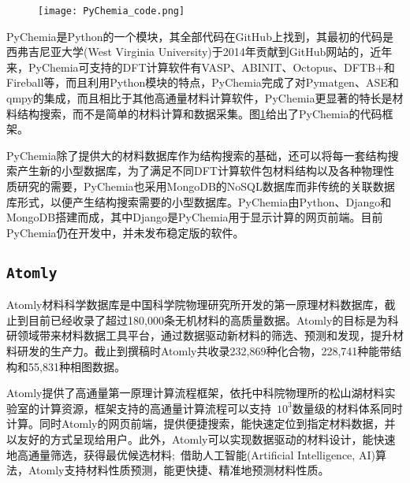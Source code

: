 \begin{figure}[h!]
\centering
\vspace*{-0.1in}
\texttt{[image: PyChemia\_code.png]}
\caption{\fontsize{7.2pt}{4.2pt}}%
\label{PyChemia_FireWork}
\end{figure} 
\textrm{PyChemia}是\textrm{Python}的一个模块，其全部代码在\textrm{GitHub}上找到\cite{PyChemia_Github}，其最初的代码是西弗吉尼亚大学\textrm{(West Virginia University)}于2014年贡献到\textrm{GitHub}网站的，近年来，\textrm{PyChemia}可支持的\textrm{DFT}计算软件有\textrm{VASP}、\textrm{ABINIT}、\textrm{Octopus}、\textrm{DFTB+}和\textrm{Fireball}等，而且利用Python模块的特点，\textrm{PyChemia}完成了对\textrm{Pymatgen}、\textrm{ASE}和\textrm{qmpy}的集成，而且相比于其他高通量材料计算软件，\textrm{PyChemia}更显著的特长是材料结构搜索，而不是简单的材料计算和数据采集。图\ref{PyChemia_FireWork}给出了\textrm{PyChemia}的代码框架。

\textrm{PyChemia}除了提供大的材料数据库作为结构搜索的基础，还可以将每一套结构搜索产生新的小型数据库，为了满足不同\textrm{DFT}计算软件包材料结构以及各种物理性质研究的需要，\textrm{PyChemia}也采用\textrm{MongoDB}的\textrm{NoSQL}数据库而非传统的关联数据库形式，以便产生结构搜索需要的小型数据库。\textrm{PyChemia}由\textrm{Python}、\textrm{Django}和\textrm{MongoDB}搭建而成，其中\textrm{Django}是\textrm{PyChemia}用于显示计算的网页前端。目前\textrm{PyChemia}仍在开发中，并未发布稳定版的软件。

\subsection{\tt{Atomly}}
\textrm{Atomly}材料科学数据库\cite{ATOMLY_URL}是中国科学院物理研究所开发的第一原理材料数据库，截止到目前已经收录了超过180,000条无机材料的高质量数据。\textrm{Atomly}的目标是为科研领域带来材料数据工具平台，通过数据驱动新材料的筛选、预测和发现，提升材料研发的生产力。截止到撰稿时\textrm{Atomly}共收录232,869种化合物，228,741种能带结构和55,831种相图数据。

\textrm{Atomly}提供了高通量第一原理计算流程框架\cite{arXiv2108_00359v1}，依托中科院物理所的松山湖材料实验室的计算资源，框架支持的高通量计算流程可以支持~$10^3$数量级的材料体系同时计算。同时\textrm{Atomly}的网页前端，提供便捷搜索，能快速定位到指定材料数据，并以友好的方式呈现给用户。此外，\textrm{Atomly}可以实现数据驱动的材料设计，能快速地高通量筛选，获得最优候选材料;~借助人工智能\textrm{(Artificial Intelligence, AI)}算法，\textrm{Atomly}支持材料性质预测，能更快捷、精准地预测材料性质。
